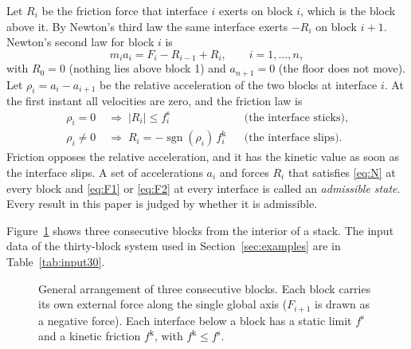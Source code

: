 \documentclass[11pt,a4paper]{article}
\newcommand{\fs}{f^{\mathrm{s}}}
\newcommand{\fkin}{f^{\mathrm{k}}}
\DeclareMathOperator{\sgn}{sgn}
\begin{document}
Let $R_i$ be the friction force that interface $i$ exerts on block $i$, which is the block above it. By Newton's third law the same interface exerts $-R_i$ on block $i+1$. Newton's second law for block $i$ is
\begin{equation}\tag{N}\label{eq:N}
m_i a_i=F_i-R_{i-1}+R_i,\qquad i=1,\dots,n,
\end{equation}
with $R_0=0$ (nothing lies above block 1) and $a_{n+1}=0$ (the floor does not move). Let $\rho_i=a_i-a_{i+1}$ be the relative acceleration of the two blocks at interface $i$. At the first instant all velocities are zero, and the friction law is
\begin{align}
\tag{F1}\label{eq:F1}
\rho_i=0&\;\Longrightarrow\;|R_i|\le \fs_i &&\text{(the interface sticks),}\\
\tag{F2}\label{eq:F2}
\rho_i\ne0&\;\Longrightarrow\;R_i=-\sgn(\rho_i)\,\fkin_i &&\text{(the interface slips).}
\end{align}
Friction opposes the relative acceleration, and it has the kinetic value as soon as the interface slips. A set of accelerations $a_i$ and forces $R_i$ that satisfies \eqref{eq:N} at every block and \eqref{eq:F1} or \eqref{eq:F2} at every interface is called an \emph{admissible state}. Every result in this paper is judged by whether it is admissible.

Figure~\ref{fig:blocks} shows three consecutive blocks from the interior of a stack. The input data of the thirty-block system used in Section~\ref{sec:examples} are in Table~\ref{tab:input30}.

\begin{figure}[ht]
\centering
{}
\caption{General arrangement of three consecutive blocks. Each block carries its own external force along the single global axis ($F_{i+1}$ is drawn as a negative force). Each interface below a block has a static limit $\fs$ and a kinetic friction $\fkin$, with $\fkin\le\fs$.}\label{fig:blocks}
\end{figure}
\end{document}
